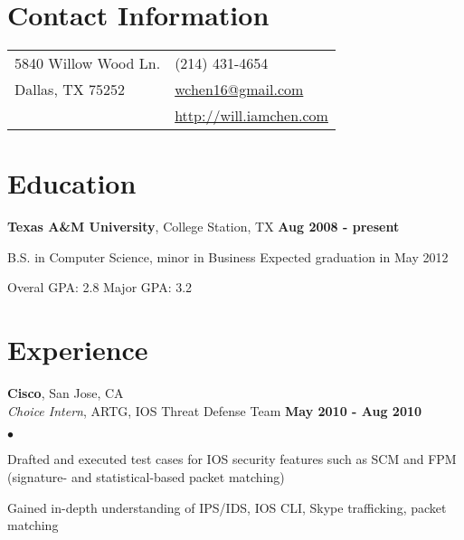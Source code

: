 \documentclass[margin,line]{res}
\newenvironment{list1}{
  \begin{list}{\ding{113}}{%
      \setlength{\itemsep}{0in}
      \setlength{\parsep}{0in} \setlength{\parskip}{0in}
      \setlength{\topsep}{0in} \setlength{\partopsep}{0in} 
      \setlength{\leftmargin}{0.17in}}}{\end{list}}
\newenvironment{list2}{
  \begin{list}{$\bullet$}{%
      \setlength{\itemsep}{0in}
      \setlength{\parsep}{0in} \setlength{\parskip}{0in}
      \setlength{\topsep}{0in} \setlength{\partopsep}{0in} 
      \setlength{\leftmargin}{0.18in}}}{\end{list}}
\begin{document}

\begin{resume}
\section{\sc Contact Information}
\vspace{.05in}
\begin{tabular}{@{}p{3in}p{4in}}
5840 Willow Wood Ln.        & (214) 431-4654 \\
Dallas, TX 75252            & \href{mailto:wchen16@gmail.com}{wchen16@gmail.com} \\
                            & \href{http://will.iamchen.com}{http://will.iamchen.com} \\
\end{tabular}

%
%
\section{\sc Education}
{\bf Texas A\&M University}, College Station, TX \hfill {\bf Aug 2008 - present} \\
\vspace*{-3mm}
\begin{list1}
\item[] \hspace*{-5mm} B.S. in Computer Science, minor in Business \hfill Expected graduation in May 2012 
\item[] \hspace*{-5mm} Overal GPA: 2.8 \hspace{5mm} Major GPA: 3.2
\end{list1}


%
%
\section{\sc Experience}
{\bf Cisco}, San Jose, CA \\
{\em Choice Intern}, ARTG, IOS Threat Defense Team \hfill {\bf May 2010 - Aug 2010}\\
\vspace{-3mm}
\begin{list2}
\item Drafted and executed test cases for IOS security features such as SCM and FPM
  (signature- and statistical-based packet matching)
\item Gained in-depth understanding of IPS/IDS, IOS CLI, Skype trafficking, packet matching
\end{list2}


\end{resume}
\end{document}
